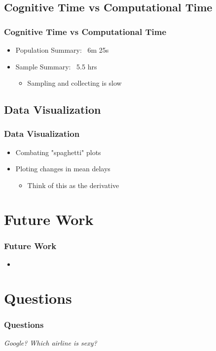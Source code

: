 \documentclass{beamer}
\begin{document}
\subsection{Cognitive Time vs Computational Time}
\begin{frame}
\frametitle{Cognitive Time vs Computational Time}
\begin{itemize}
\item Population Summary: ~6m 25s
\item Sample Summary: ~5.5 hrs 
\begin{itemize}
\item Sampling and collecting is slow 
\end{itemize}
\end{itemize}

\end{frame}

\subsection{Data Visualization}
\begin{frame}
\frametitle{Data Visualization}
\begin{itemize}
\item Combating "spaghetti" plots
\item Ploting changes in mean delays 
\begin{itemize}
\item Think of this as the derivative 
\end{itemize}
\end{itemize}

\end{frame}

\section{Future Work}
\begin{frame}
\frametitle{Future Work}
\begin{itemize}
\item 
\end{itemize}

\end{frame}

\section{Questions}
\begin{frame}
\frametitle{Questions}
\begin{center}
\emph{Google? Which airline is sexy?}
\end{center}



\end{frame}

 
\end{document}
